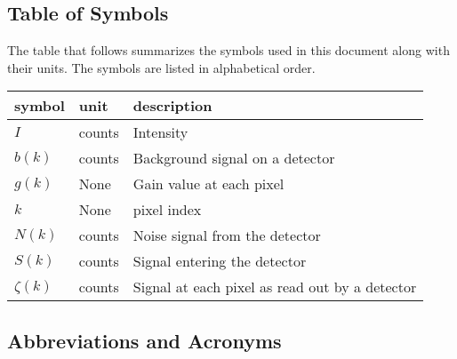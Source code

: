 \documentclass[12pt]{article}
\begin{document}
\subsection{Table of Symbols}

The table that follows summarizes the symbols used in this document along with
their units. The symbols are listed in alphabetical order.

\renewcommand{\arraystretch}{1.2}
\noindent \begin{longtable*}{l l p{12cm}} \toprule
\textbf{symbol} & \textbf{unit} & \textbf{description}\\
\midrule 
$I$ & counts & Intensity\\
$b(k)$ & counts & Background signal on a detector\\
$g(k)$ & None & Gain value at each pixel\\
$k$ & None & pixel index\\
$N(k)$ & counts & Noise signal from the detector\\
$S(k)$ & counts & Signal entering the detector\\
$\zeta(k)$ & counts & Signal at each pixel as read out by a detector\\
\bottomrule
\end{longtable*}

\subsection{Abbreviations and Acronyms}
\end{document}
